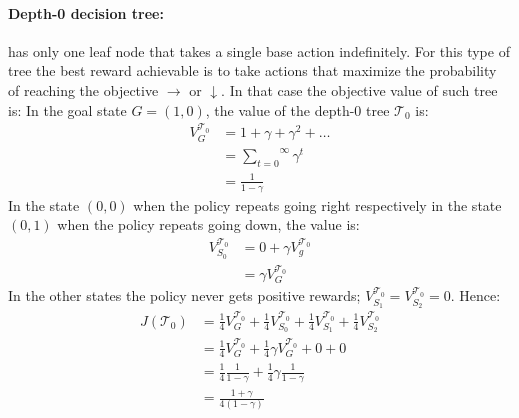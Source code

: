 \paragraph{Depth-0 decision tree:} has only one leaf node that takes a single base action indefinitely.
For this type of tree the best reward achievable is to take actions that maximize the probability of reaching the objective $\rightarrow$ or $\downarrow$. In that case the objective value of such tree is:
In the goal state $G = (1, 0)$, the value of the depth-0 tree $\mathcal{T}_0$ is:
\begin{align*}
    V^{\mathcal{T}_0}_G &= 1 + \gamma + \gamma^2 + \dots \\
    &= \overset{\infty}{\underset{t=0}\sum} \gamma^t \\
    &= \frac{1}{1 - \gamma}
\end{align*}
In the state $(0, 0)$ when the policy repeats going right respectively in the state $(0, 1)$ when the policy repeats going down, the value is:
\begin{align*}
    V^{\mathcal{T}_0}_{S_0} &= 0 + \gamma V^{\mathcal{T}_0}_g \\
    &= \gamma V^{\mathcal{T}_0}_G
\end{align*}
In the other states the policy never gets positive rewards; $V^{\mathcal{T}_0}_{S_1} = V^{\mathcal{T}_0}_{S_2} = 0$. Hence:
\begin{align*}
J(\mathcal{T}_0) &= \frac{1}{4} V^{\mathcal{T}_0}_G + \frac{1}{4} V^{\mathcal{T}_0}_{S_0}+ \frac{1}{4} V^{\mathcal{T}_0}_{S_1}+ \frac{1}{4} V^{\mathcal{T}_0}_{S_2} \\
&= \frac{1}{4} V^{\mathcal{T}_0}_G + \frac{1}{4} \gamma V^{\mathcal{T}_0}_G + 0 + 0\\
&= \frac{1}{4} \frac{1}{1 - \gamma} + \frac{1}{4} \gamma \frac{1}{1 - \gamma} \\
&= \frac{1 + \gamma}{4(1 - \gamma)}
\end{align*}

